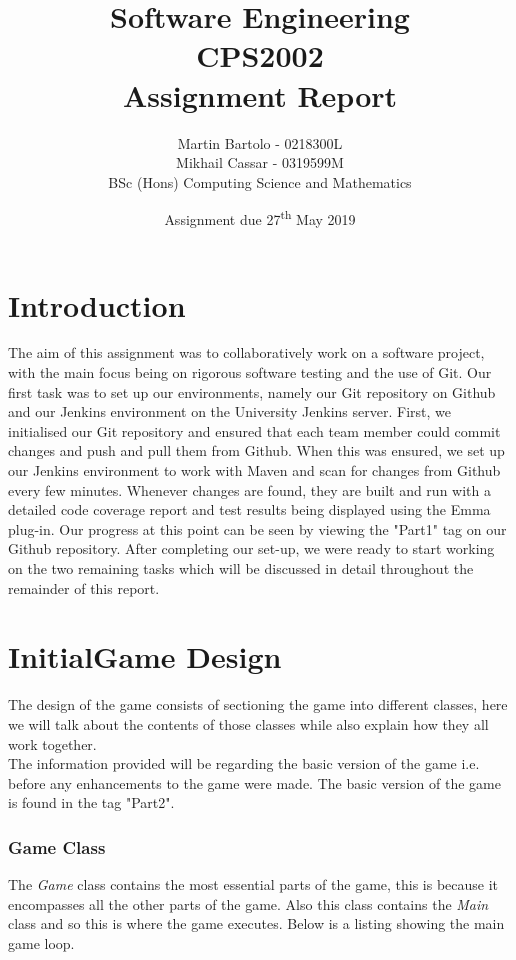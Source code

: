 \documentclass[a4paper,12pt]{extarticle}
\title{\textbf{Software Engineering\\\vspace{5mm} CPS2002\\\vspace{5mm}  Assignment Report}}
\author{\LARGE Martin Bartolo - 0218300L\vspace{1mm}\\ \LARGE Mikhail Cassar - 0319599M\vspace{3mm}\\ \large BSc (Hons) Computing Science and Mathematics}
\date{Assignment due 27\textsuperscript{th} May 2019}
\begin{document}
\setlength{\parindent}{10pt}
\setlength{\footskip}{50pt}

\maketitle
\thispagestyle{empty}
\newpage

\tableofcontents
\newpage

\section{Introduction}
The aim of this assignment was to collaboratively work on a software project, with the main focus being on rigorous software testing and the use of Git. Our first task was to set up our environments, namely our Git repository on Github and our Jenkins environment on the University Jenkins server. First, we initialised our Git repository and ensured that each team member could commit changes and push and pull them from Github. When this was ensured, we set up our Jenkins environment to work with Maven and scan for changes from Github every few minutes. Whenever changes are found, they are built and run with a detailed code coverage report and test results being displayed using the Emma plug-in. Our progress at this point can be seen by viewing the "Part1" tag on our Github repository. After completing our set-up, we were ready to start working on the two remaining tasks which will be discussed in detail throughout the remainder of this report.
\newpage

\section{InitialGame Design}
\noindent The design of the game consists of sectioning the game into different classes, here we will talk about the contents of those classes while also explain how they all work together.\\

\noindent The information provided will be regarding the basic version of the game i.e. before any enhancements to the game were made. The basic version of the game is found in the tag "Part2".

\subsubsection{Game Class}

\noindent The \textit{Game} class contains the most essential parts of the game, this is because it encompasses all the other parts of the game. Also this class contains the \textit{Main} class and so this is where the game executes. Below is a listing showing the main game loop.
\end{document}
